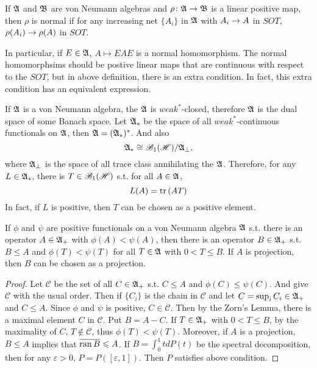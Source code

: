 \documentclass[a4paper,11pt]{report}
\begin{document}
\begin{defn}
	If $\mathfrak{A}$ and $\mathfrak{B}$ are von Neumann algebras and $\rho \colon \mathfrak{A} \rightarrow \mathfrak{B}$ is a linear positive map, then $\rho$ is normal if for any increasing net $\{A_i\}$ in $\mathfrak{A}$ with $A_i \rightarrow A$ in $SOT$, $\rho(A_i) \rightarrow \rho(A)$ in $SOT$.
\end{defn}
\begin{rem}
	In particular, if $E \in \mathfrak{A}$, $A \mapsto EAE$ is a normal homomorphism. The normal homomorphsims should be postive linear maps that are continuous with respect to the $SOT$, but in above definition, there is an extra condition. In fact, this extra condition has an equivalent expression.
\end{rem}

If $\mathfrak{A}$ is a von Neumann algebra, the $\mathfrak{A}$ is $weak^*$-closed, therefore $\mathfrak{A}$ is the dual space of some Banach space. Let $\mathfrak{A}_*$ be the space of all $weak^*$-continuous functionals on $\mathfrak{A}$, then $\mathfrak{A}  = (\mathfrak{A}_*)^*$. And also 
\begin{equation*}
	\mathfrak{A}_* \cong \mathscr{B}_{1}\mathscr{(H)} / \mathfrak{A}_{\bot},
\end{equation*}
where $\mathfrak{A}_{\bot}$ is the space of all trace class annihilating the $\mathfrak{A}$. Therefore, for any $L \in \mathfrak{A}_*$, there is $T \in \mathscr{B}_{1}\mathscr{(H)}$ s.t. for all $A \in \mathfrak{A}$, 
\begin{equation*}
	L(A) = \operatorname{tr}{(AT)}
\end{equation*}
In fact, if $L$ is positive, then $T$ can be chosen as a positive element.

\begin{lem}
	If $\phi$ and $\psi$ are positive functionals on a von Neumann algebra $\mathfrak{A}$ s.t. there is an operator $A \in \mathfrak{A}_+$ with $\phi(A)  < \psi(A)$, then there is an operator $B \in \mathfrak{A}_+$ s.t. $B \leqslant A$ and $\phi(T) < \psi(T)$ for all $T \in \mathfrak{A}$ with $0 <  T \leqslant  B$. If $A$ is projection, then $B$ can be chosen as a projection.
\end{lem}
\begin{proof}
	Let $\mathcal{C}$ be the set of all $C \in \mathfrak{A}_+$ s.t. $C \leqslant A$ and $\phi(C) \leqslant \psi(C)$. And give $\mathcal{C}$ with the usual order. Then if $\{C_i\}$ is the chain in $\mathcal{C}$ and let $C = \sup_i C_i \in \mathfrak{A}_+$  and $C \leqslant A$. Since $\phi$ and $\psi$ is positive, $C \in \mathcal{C}$. Then by the Zorn's Lemma, there is a maximal element $C$ in $\mathcal{C}$. Put $B = A-C$. If $T \in \mathfrak{A}_+$ with $0 < T \leqslant B$, by the maximality of $C$, $T \notin \mathcal{C}$, thus $\phi(T) < \psi(T)$. Moreover, if $A$ is a projection, $B \leqslant A$ implies that $\overline{\operatorname{ran}{B}} \leqslant A$. If $B = \int_0^1 t dP(t)$ be the spectral decomposition, then for any $\varepsilon >  0$, $P = P([\varepsilon,1])$. Then $P$ satisfies above condition.
\end{proof}
\end{document}

